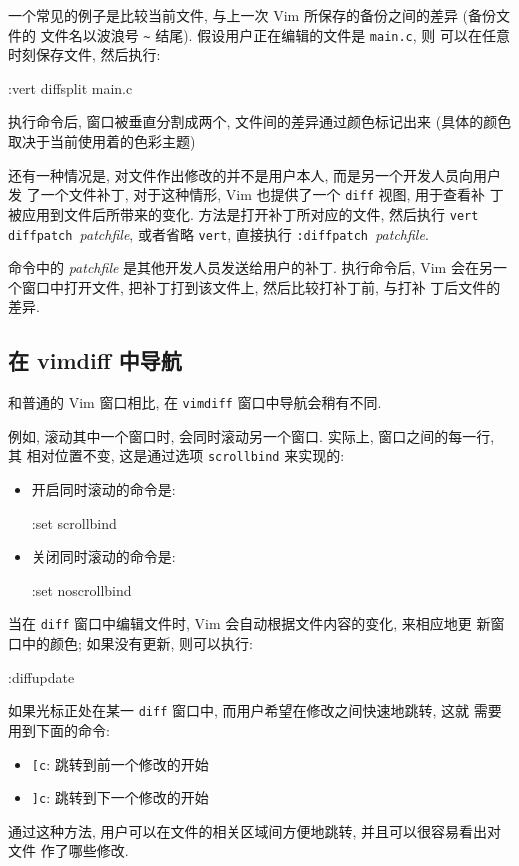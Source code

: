 一个常见的例子是比较当前文件, 与上一次 Vim 所保存的备份之间的差异 (备份文件的
文件名以波浪号 \verb'~' 结尾). 假设用户正在编辑的文件是 \texttt{main.c}, 则
可以在任意时刻保存文件, 然后执行:
\begin{vimcode}
:vert diffsplit main.c~
\end{vimcode}
执行命令后, 窗口被垂直分割成两个, 文件间的差异通过颜色标记出来 (具体的颜色
取决于当前使用着的色彩主题)

还有一种情况是, 对文件作出修改的并不是用户本人,  而是另一个开发人员向用户发
了一个文件补丁, 对于这种情形, Vim 也提供了一个 \texttt{diff} 视图, 用于查看补
丁被应用到文件后所带来的变化. 方法是打开补丁所对应的文件, 然后执行 \texttt{vert
diffpatch }\textit{patchfile}, 或者省略 \texttt{vert}, 直接执行
\texttt{:diffpatch }\textit{patchfile}.

命令中的 \textit{patchfile} 是其他开发人员发送给用户的补丁. 执行命令后,
Vim 会在另一个窗口中打开文件, 把补丁打到该文件上, 然后比较打补丁前, 与打补
丁后文件的差异.

\subsection{在 vimdiff 中导航}
\label{subsec:navigation_in_vimdiff}

和普通的 Vim 窗口相比, 在 \texttt{vimdiff} 窗口中导航会稍有不同.

例如, 滚动其中一个窗口时, 会同时滚动另一个窗口. 实际上, 窗口之间的每一行, 其
相对位置不变, 这是通过选项 \texttt{scrollbind} 来实现的:
\begin{itemize}
    \item 开启同时滚动的命令是:
\begin{vimcode}
:set scrollbind
\end{vimcode}
    \item 关闭同时滚动的命令是:
\begin{vimcode}
:set noscrollbind
\end{vimcode}
\end{itemize}

当在 \texttt{diff} 窗口中编辑文件时, Vim 会自动根据文件内容的变化, 来相应地更
新窗口中的颜色; 如果没有更新, 则可以执行:
\begin{vimcode}
:diffupdate
\end{vimcode}

如果光标正处在某一 \texttt{diff} 窗口中, 而用户希望在修改之间快速地跳转, 这就
需要用到下面的命令:
\begin{itemize}
    \item \texttt{[c}: 跳转到前一个修改的开始
    \item \texttt{]c}: 跳转到下一个修改的开始
\end{itemize}
通过这种方法, 用户可以在文件的相关区域间方便地跳转, 并且可以很容易看出对文件
作了哪些修改.

